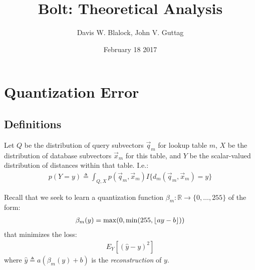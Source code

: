 \documentclass[]{article}
\begin{document}
\title{Bolt: Theoretical Analysis}

\author{Davis W. Blalock, John V. Guttag}



\date{\Large February 18 2017}
\maketitle

\section{Quantization Error}

\subsection{Definitions}

Let $Q$ be the distribution of query subvectors $\vec{q}_m$ for lookup table $m$, $X$ be the distribution of database subvectors $\vec{x}_m$ for this table, and $Y$ be the scalar-valued distribution of distances within that table. I.e.:
\begin{align}
    p(Y = y) \triangleq \int_{Q, X} p(\vec{q}_m, \vec{x}_m)I\{d_m(\vec{q}_m, \vec{x}_m) = y\}
\end{align}

Recall that we seek to learn a quantization function $\beta_m: \mathbb{R} \rightarrow \{0,\ldots,255\}$ of the form:
\begin{align}
    \beta_m(y) = \max(0, \min(255, \floor*{ay - b}))
\end{align}
\noindent that minimizes the loss:
\begin{align}
    E_Y[(\hat{y} - y)^2]
\end{align}
where $\hat{y} \triangleq a(\beta_m(y) + b)$ is the \textit{reconstruction} of $y$.
\end{document}
